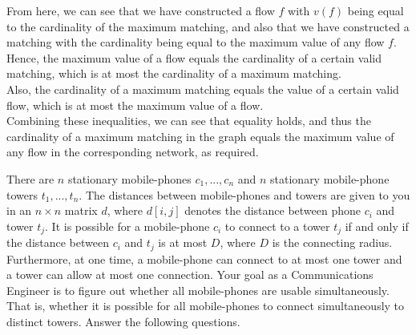 \documentclass[answers]{exam}
\newcommand{\nl}{\vspace{0.2cm}\\}
\begin{document}
\begin{questions}
\begin{parts}
\begin{solution}
From here, we can see that we have constructed a flow $f$ with $v(f)$ being equal to the cardinality of the maximum matching, and also that we have constructed a matching with the cardinality being equal to the maximum value of any flow $f$.\nl
Hence, the maximum value of a flow equals the cardinality of a certain valid matching, which is at most the cardinality of a maximum matching.\nl
Also, the cardinality of a maximum matching equals the value of a certain valid flow, which is at most the maximum value of a flow.\nl
Combining these inequalities, we can see that equality holds, and thus the cardinality of a maximum matching in the graph equals the maximum value of any flow in the corresponding network, as required.
\end{solution}

\end{parts}










\newpage







\question[20] There are $n$ stationary mobile-phones $c_1, ..., c_n$ and $n$ stationary mobile-phone towers $t_1, ..., t_n$. 
The distances between mobile-phones and towers are given to you in an $n \times n$ matrix $d$, where $d[i, j]$ denotes the distance between phone $c_i$ and tower $t_j$.
It is possible for a mobile-phone $c_i$ to connect to a tower $t_j$ if and only if the distance between $c_i$ and $t_j$ is at most $D$, where $D$ is the connecting radius. 
Furthermore, at one time, a mobile-phone can connect to at most one tower and a tower can allow at most one connection. 
Your goal as a Communications Engineer is to figure out whether all mobile-phones are usable simultaneously. 
That is, whether it is possible for all mobile-phones to connect simultaneously to distinct towers. Answer the following questions.

\begin{parts}

\end{parts}
\end{questions}
\end{document}
